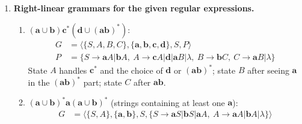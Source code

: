 \begin{enumerate}[{8.}1. ]
\begin{enumerate}
Properly, introduce an intermediate state $D$ for ``seen the dot'':
States $\{I, D, F\}$, start $I$, final $\{F\}$.
$\delta(I,\pmb{0}) = I$, $\delta(I,\pmb{1}) = I$, $\delta(I,\pmb{.}) = D$, $\delta(D,\pmb{0}) = F$, $\delta(D,\pmb{1}) = F$, $\delta(F,\pmb{0}) = F$, $\delta(F,\pmb{1}) = F$, $\delta(F,\lambda) = \text{accept}$. (And $I \xrightarrow{\pmb{0}} D$ and $I \xrightarrow{\pmb{1}} D$ would model $\pmb{0.}$ and $\pmb{1.}$ productions.)

\item Right-linear equations:
\begin{align*}
I &= \pmb{0}I \cup \pmb{1}I \cup \pmb{0}\pmb{.}F \cup \pmb{1}\pmb{.}F \\
F &= \lambda \cup \pmb{0}F \cup \pmb{1}F
\end{align*}

\item Solving: $F = (\pmb{0}\cup\pmb{1})^*$ (by Arden's on $F = \pmb{0}F\cup\pmb{1}F\cup\lambda$).
Substituting into $I$: $I = (\pmb{0}\cup\pmb{1})I \cup (\pmb{0}\cup\pmb{1})\pmb{.}(\pmb{0}\cup\pmb{1})^*$.
By Arden's: $I = (\pmb{0}\cup\pmb{1})^+\pmb{.}(\pmb{0}\cup\pmb{1})^*$.
\end{enumerate}

\item \textbf{Right-linear grammars for the given regular expressions.}

\begin{enumerate}
\item $(\pmb{a}\cup\pmb{b})\pmb{c}^*(\pmb{d}\cup(\pmb{ab})^*)$:
\begin{align*}
G &= \langle\{S,A,B,C\},\{\pmb{a},\pmb{b},\pmb{c},\pmb{d}\},S,P\rangle \\
P &= \{S\to\pmb{a}A|\pmb{b}A,\ A\to\pmb{c}A|\pmb{d}|\pmb{a}B|\lambda,\ B\to\pmb{b}C,\ C\to\pmb{a}B|\lambda\}
\end{align*}
State $A$ handles $\pmb{c}^*$ and the choice of $\pmb{d}$ or $(\pmb{ab})^*$; state $B$ after seeing $\pmb{a}$ in the $(\pmb{ab})^*$ part; state $C$ after $\pmb{ab}$.

\item $(\pmb{a}\cup\pmb{b})^*\pmb{a}(\pmb{a}\cup\pmb{b})^*$ (strings containing at least one $\pmb{a}$):
\begin{align*}
G &= \langle\{S,A\},\{\pmb{a},\pmb{b}\},S,\{S\to\pmb{a}S|\pmb{b}S|\pmb{a}A,\ A\to\pmb{a}A|\pmb{b}A|\lambda\}\rangle
\end{align*}
\end{enumerate}


\end{enumerate}
